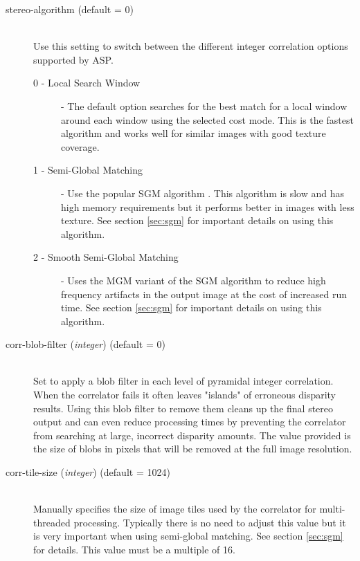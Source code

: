 \begin{description}
\item[stereo-algorithm \textnormal (default = 0)] \hfill \\

  Use this setting to switch between the different integer correlation options supported by ASP.  
  \begin{description}
    \item[0 - Local Search Window] - The default option searches for the best match
    for a local window around each window using the selected cost mode.  This is the 
    fastest algorithm and works well for similar images with good texture coverage.

    \item[1 - Semi-Global Matching] - Use the popular SGM algorithm \citep{hirschmuller_sgm_original}.
    This algorithm is slow and has high memory requirements but it performs better in images with
    less texture.  See section \ref{sec:sgm} for important details on using this algorithm.

    \item[2 - Smooth Semi-Global Matching] - Uses the MGM variant of the SGM algorithm 
    \citep{facciolo2015mgm} to reduce high frequency artifacts in the output image at the cost 
    of increased run time. See section \ref{sec:sgm} for important details on using this algorithm.
  \end{description}

\item[corr-blob-filter \textnormal{\small{(\emph{integer})}} (default = 0)]\hfill \\

  Set to apply a blob filter in each level of pyramidal integer correlation.
  When the correlator fails it often leaves "islands" of erroneous disparity results.
  Using this blob filter to remove them cleans up the final stereo output and
  can even reduce processing times by preventing the correlator from searching
  at large, incorrect disparity amounts.  The value provided is the size of blobs
  in pixels that will be removed at the full image resolution.

\item[corr-tile-size \textnormal{\small{(\emph{integer})}} (default = 1024)]\hfill \\

  Manually specifies the size of image tiles used by the correlator for multi-threaded
  processing. Typically there is no need to adjust this value but it is very important
  when using semi-global matching. See section \ref{sec:sgm} for details.  This value
  must be a multiple of 16.


\end{description}
